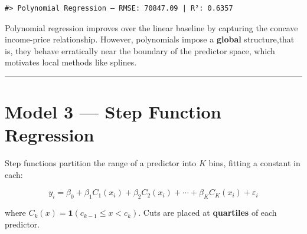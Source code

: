 \documentclass[
]{article}
\begin{document}
\begin{verbatim}
#> Polynomial Regression — RMSE: 70847.09 | R²: 0.6357
\end{verbatim}

Polynomial regression improves over the linear baseline by capturing the
concave income-price relationship. However, polynomials impose a
\textbf{global} structure,that is, they behave erratically near the
boundary of the predictor space, which motivates local methods like
splines.

\begin{center}\rule{0.5\linewidth}{0.5pt}\end{center}

\section{Model 3 --- Step Function Regression}\label{step}

Step functions partition the range of a predictor into \(K\) bins,
fitting a constant in each:

\[y_i = \beta_0 + \beta_1 C_1(x_i) + \beta_2 C_2(x_i) + \cdots + \beta_K C_K(x_i) + \varepsilon_i\]

where \(C_k(x) = \mathbf{1}(c_{k-1} \le x < c_k)\). Cuts are placed at
\textbf{quartiles} of each predictor.
\end{document}
